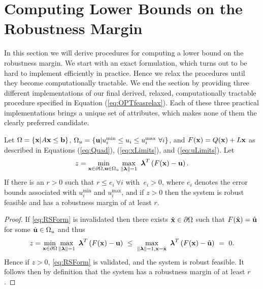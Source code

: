\section{Computing Lower Bounds on the Robustness Margin} \label{sec:inbdform}

In this section we will derive procedures for computing a lower bound on the robustness margin. 
We start with an exact formulation, which turns out to be hard to implement efficiently in practice.
Hence we relax the procedures until they become computationally tractable. 
We end the section by providing three different implementations of our final derived, relaxed, computationally tractable procedure specified in Equation (\ref{eq:OPTfeasrelax}).
Each of these three practical implementations brings a unique set of attributes, which makes none of them the clearly preferred candidate.

\smallskip
\begin{thm}
  Let $\Omega=\{\mathbf{x}| A\mathbf{x} \leq \mathbf{b}\}$, $\Omega_{u}=\{\mathbf{u}| u^{\min}_i\leq u_i \leq u^{\max}_i \ \forall i \}$, and $F(\mathbf{x})=Q(\mathbf{x})+L\mathbf{x}$ as described in Equations (\ref{eq:Quad}), (\ref{eq:xLimits}), and (\ref{eq:uLimits}). 
  Let
  \[
  z = \min\limits_{\vx\in \partial \Omega, \vu\in \Omega_{u} }\max\limits_{\norm{\vlambda}=1}\ \vlambda^T\left(F(\vx)-\vu\right).
  \]
  If there is an $r>0$ such that $r \leq e_i \ \forall i$ with $\ e_i>0$, where $e_i$ denotes the error bounds associated with $ u^{\min}_i$ and $ u^{\max}_i$, and if $z > 0$ then the system is robust feasible and has a robustness margin of at least $r$.

  \medskip
  \begin{proof} 
    If \cref{eq:RSForm} is invalidated then there exists $\hat{\mathbf{x}} \in \partial\Omega$ such that $F(\hat{\mathbf{x}})=\hat{\mathbf{u}}$ for some $\hat{\mathbf{u}}\in\Omega_{u}$ and thus
    \[
    z = \min\limits_{\vx\in \partial \Omega}\max\limits_{\norm{\vlambda}=1}\ \vlambda^T\left(F(\vx)-\vu\right) ~\leq~ \max\limits_{\norm{\vlambda}=1, \vx=\hat{\vx}}\ \vlambda^T\left(F(\vx)-\hat{\vu}\right) ~=~ 0.
    \]
    Hence if $z>0$, \cref{eq:RSForm} is validated, and the system is robust feasible.
    It follows then by definition that the system has a robustness margin of at least $r$.
  \end{proof}
\end{thm}

